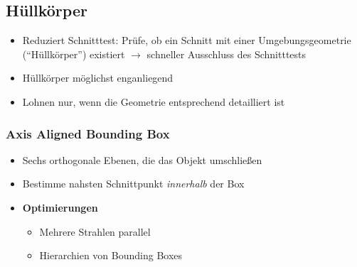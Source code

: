 \subsection{Hüllkörper}
\begin{itemize}
	\item Reduziert Schnitttest: Prüfe, ob ein Schnitt mit einer Umgebungsgeometrie ("`Hüllkörper"') existiert \(\rightarrow\) schneller Ausschluss des Schnitttests
	\item Hüllkörper möglichst enganliegend
	\item Lohnen nur, wenn die Geometrie entsprechend detailliert ist
\end{itemize}

\subsubsection{Axis Aligned Bounding Box}
\begin{itemize}
	\item Sechs orthogonale Ebenen, die das Objekt umschließen
	\item Bestimme nahsten Schnittpunkt \textit{innerhalb} der Box
	\item \textbf{Optimierungen}
	\begin{itemize}
		\item Mehrere Strahlen parallel
		\item Hierarchien von Bounding Boxes
	\end{itemize}
\end{itemize}


